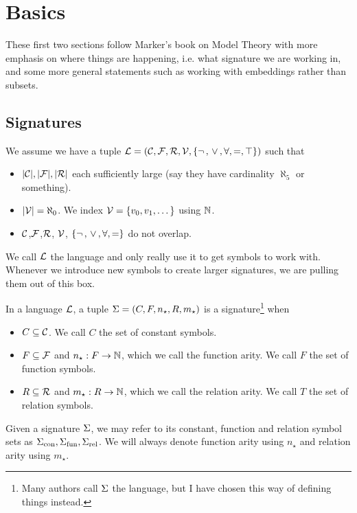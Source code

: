 \section{Basics}
These first two sections follow Marker's book on Model Theory 
\cite{marker} with more 
emphasis on where things are happening, i.e. what signature we are working in,
and some more general statements such as working with embeddings rather than 
subsets.

\subsection{Signatures}
\begin{dfn}
    We assume we have a tuple
    $\mathcal{L} = (\mathcal{C},\mathcal{F},\mathcal{R},\mathcal{V},\left\{\neg\,,\, \lor \,,\forall,=,\top\right\})$ such that 
    \begin{itemize}
        \item $|\mathcal{C}|,|\mathcal{F}|,|\mathcal{R}|$ each sufficiently large 
            (say they have cardinality $\aleph_5$ or something).
        \item $|\mathcal{V}| = \aleph_0$. 
            We index $\mathcal{V} = \left\{v_0, v_1, \dots \right\}$ using $\mathbb{N}$.
        \item $\mathcal{C}$,$\mathcal{F}$,$\mathcal{R}$, $\mathcal{V}$, $\left\{\neg\,,\, \lor \,,\forall,=\right\}$ 
            do not overlap.
    \end{itemize}
    We call $\mathcal{L}$ the language and only really 
    use it to get symbols to work with.
    Whenever we introduce new symbols to create larger signatures, 
    we are pulling them out of this box.
\end{dfn}

\begin{dfn}[Signature]
    In a language $\mathcal{L}$, 
    a tuple $\Sigma = (C,F,n_\star ,R, m_\star)$ is a signature\footnote{
        Many authors call $\Sigma$ the language, 
        but I have chosen this way of defining things instead.
    } when 
    \begin{itemize}
        \item $C \subseteq \mathcal{C}$. 
            We call $C$ the set of constant symbols.
        \item $F \subseteq \mathcal{F}$ and 
            $n_{\star} : F \to \mathbb{N}$, 
            which we call the function arity. 
            We call $F$ the set of function symbols.
        \item $R \subseteq \mathcal{R}$
            and $m_{\star} : R \to \mathbb{N}$,
            which we call the relation arity.
            We call $T$ the set of relation symbols.
    \end{itemize}
    Given a signature $\Sigma$, we may refer to its constant, 
    function and relation symbol sets as ${\Sigma}_\mathrm{con},{\Sigma}_\mathrm{fun},{\Sigma}_\mathrm{rel}$.
    We will always denote function arity using $n_\star$ 
    and relation arity using $m_\star$.
\end{dfn}

